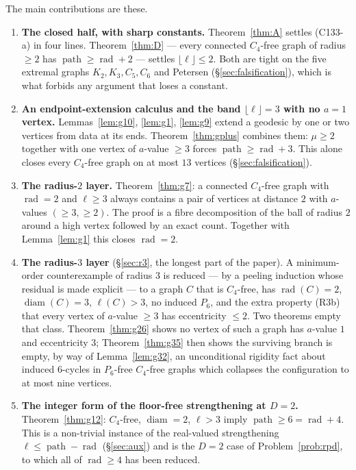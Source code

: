 \documentclass[11pt]{article}
\theoremstyle{plain}
\theoremstyle{definition}
\theoremstyle{remark}
\numberwithin{equation}{section}
\newcommand{\rad}{\operatorname{rad}}
\newcommand{\diam}{\operatorname{diam}}
\newcommand{\pth}{\operatorname{path}}
\begin{document}
The main contributions are these.

\begin{enumerate}
\item \textbf{The closed half, with sharp constants.} Theorem~\ref{thm:A} settles (C133-a) in
four lines. Theorem~\ref{thm:D} --- every connected $C_4$-free graph of radius $\ge 2$ has
$\pth \ge \rad + 2$ --- settles $\lfloor \ell\rfloor \le 2$. Both are tight on the five
extremal graphs $K_2, K_3, C_5, C_6$ and Petersen (\S\ref{sec:falsification}), which is what
forbids any argument that loses a constant.

\item \textbf{An endpoint-extension calculus and the band $\lfloor\ell\rfloor = 3$ with no
$a = 1$ vertex.} Lemmas~\ref{lem:g10}, \ref{lem:g1}, \ref{lem:g9} extend a geodesic by
one or two vertices from data at its ends. Theorem~\ref{thm:gplus} combines them:
$\mu \ge 2$ together with one vertex of $a$-value $\ge 3$ forces $\pth \ge \rad + 3$. This
alone closes every $C_4$-free graph on at most $13$ vertices (\S\ref{sec:falsification}).

\item \textbf{The radius-$2$ layer.} Theorem~\ref{thm:g7}: a connected $C_4$-free graph with
$\rad = 2$ and $\ell \ge 3$ always contains a pair of vertices at distance $2$ with
$a$-values $(\ge 3, \ge 2)$. The proof is a fibre decomposition of the ball of radius $2$
around a high vertex followed by an exact count. Together with Lemma~\ref{lem:g1} this closes
$\rad = 2$.

\item \textbf{The radius-$3$ layer} (\S\ref{sec:r3}, the longest part of the paper). A
minimum-order counterexample of radius $3$ is reduced --- by a peeling induction whose
residual is made explicit --- to a graph $C$ that is $C_4$-free, has $\rad(C) = 2$,
$\diam(C) = 3$, $\ell(C) > 3$, no induced $P_6$, and the extra property (R3b) that every
vertex of $a$-value $\ge 3$ has eccentricity $\le 2$. Two theorems empty that class.
Theorem~\ref{thm:g26} shows no vertex of such a graph has $a$-value $1$ and eccentricity $3$;
Theorem~\ref{thm:g35} then shows the surviving branch is empty, by way of
Lemma~\ref{lem:g32}, an unconditional rigidity fact about induced $6$-cycles in $P_6$-free
$C_4$-free graphs which collapses the configuration to at most nine vertices.

\item \textbf{The integer form of the floor-free strengthening at $D = 2$.}
Theorem~\ref{thm:g12}: $C_4$-free, $\diam = 2$, $\ell > 3$ imply $\pth \ge 6 = \rad + 4$.
This is a non-trivial instance of the real-valued strengthening
$\ell \le \pth - \rad$ (\S\ref{sec:aux}) and is the $D = 2$ case of Problem~\ref{prob:rpd},
to which all of $\rad \ge 4$ has been reduced.


\end{enumerate}
\end{document}
